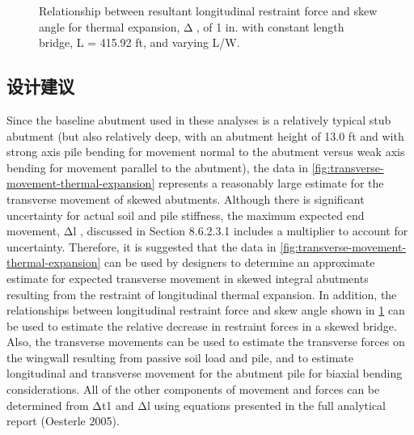 \begin{figure}
  \caption{Relationship between resultant longitudinal restraint force and skew angle for thermal expansion, Δ, of 1 in. with constant length bridge, L = 415.92 ft, and varying L/W.}
  \label{fig:restraint-force-skew-angle}
\end{figure}

\subsection{设计建议}
Since the baseline abutment used in these analyses is a relatively typical stub abutment (but also relatively deep, with an abutment height of 13.0 ft and with strong axis pile bending for movement normal to the abutment versus weak axis bending for movement parallel to the abutment), the data in \cref{fig:transverse-movement-thermal-expansion} represents a reasonably large estimate for the transverse movement of skewed abutments. Although there is significant uncertainty for actual soil and pile stiffness, the maximum expected end movement, Δl , discussed in Section 8.6.2.3.1 includes a multiplier to account for uncertainty. Therefore, it is suggested that the data in \cref{fig:transverse-movement-thermal-expansion} can be used by designers to determine an approximate estimate for expected transverse movement in skewed integral abutments resulting from the restraint of longitudinal thermal expansion. In addition, the relationships between longitudinal restraint force and skew angle shown in \cref{fig:restraint-force-skew-angle} can be used to estimate the relative decrease in restraint forces in a skewed bridge. Also, the transverse movements can be used to estimate the transverse forces on the wingwall resulting from passive soil load and pile, and to estimate longitudinal and transverse movement for the abutment pile for biaxial bending considerations. All of the other components of movement and forces can be determined from Δt1 and Δl using equations presented in the full analytical report (Oesterle 2005).
